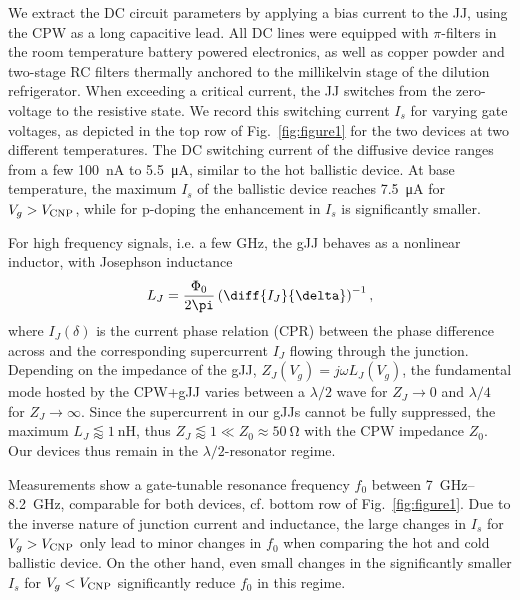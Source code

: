 We extract the DC circuit parameters by applying a bias current to the JJ, using the CPW as a long capacitive lead.
%
All DC lines were equipped with $\pi$-filters in the room temperature battery powered electronics, as well as copper powder and two-stage RC filters thermally anchored to the millikelvin stage of the dilution refrigerator.
%
When exceeding a critical current, the JJ switches from the zero-voltage to the resistive state.
%
We record this switching current $I_s$ for varying gate voltages, as depicted in the top row of Fig.~\ref{fig:figure1} for the two devices at two different temperatures.
%
The DC switching current of the diffusive device ranges from a few \SI{100}{\nano\ampere} to \SI{5.5}{\micro\ampere}, similar to the hot ballistic device.
%
At base temperature, the maximum $I_s$ of the ballistic device reaches \SI{7.5}{\micro\ampere} for $V_g>V_{\rm CNP}$, while for p-doping the enhancement in $I_s$ is significantly smaller.

For high frequency signals, i.e. a few \si{\giga\hertz}, the gJJ behaves as a nonlinear inductor, with Josephson inductance
%
\begin{align}
L_J = \frac{\Phi_0}{2\pi}\left(\diff{I_J}{\delta}\right)^{-1},
\end{align}
%
where $I_J(\delta)$ is the current phase relation (CPR) between the phase difference across and the corresponding supercurrent $I_J$ flowing through the junction.
Depending on the impedance of the gJJ, $Z_J(V_g)=j\omega L_J(V_g)$, the fundamental mode hosted by the CPW+gJJ varies between a $\lambda/2$ wave for $Z_J\rightarrow0$ and $\lambda/4$ for $Z_J\rightarrow\infty$.
%
Since the supercurrent in our gJJs cannot be fully suppressed, the maximum $L_J\lessapprox\SI{1}{\nano\henry}$, thus $Z_J\lessapprox1\ll Z_0\approx\SI{50}{\ohm}$ with the CPW impedance $Z_0$.
%
Our devices thus remain in the $\lambda/2$-resonator regime.

Measurements show a gate-tunable resonance frequency $f_0$ between \SIrange{7}{8.2}{\giga\hertz}, comparable for both devices, cf. bottom row of Fig.~\ref{fig:figure1}.
%
Due to the inverse nature of junction current and inductance, the large changes in $I_s$ for $V_g>V_{\rm CNP}$ only lead to minor changes in $f_0$ when comparing the hot and cold ballistic device.
%
On the other hand, even small changes in the significantly smaller $I_s$ for $V_g<V_{\rm CNP}$ significantly reduce $f_0$ in this regime.

